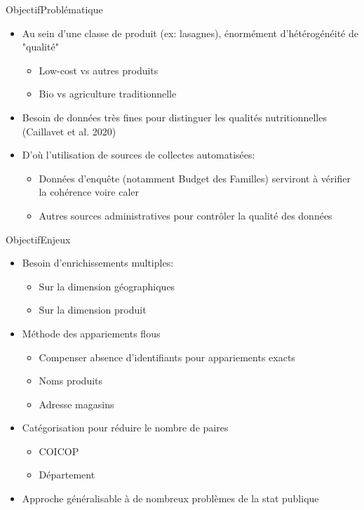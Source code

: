 \documentclass[ignorenonframetext,]{beamer}
\begin{document}
\begin{frame}{Objectif}{Problématique}

\begin{itemize}
    \item Au sein d'une classe de produit (ex: lasagnes), énormément d'hétérogénéité de "qualité"
\begin{itemize}
    \item Low-cost vs autres produits
    \item Bio vs agriculture traditionnelle
\end{itemize}
    \item Besoin de données très fines pour distinguer les qualités nutritionnelles (Caillavet et al. 2020)
    \item D'où l'utilisation de sources de collectes automatisées:
\begin{itemize}
    \item Données d'enquête (notamment Budget des Familles) serviront à vérifier la cohérence voire caler
    \item Autres sources administratives pour contrôler la qualité des données
\end{itemize}
\end{itemize}
\end{frame}

\begin{frame}{Objectif}{Enjeux}

\begin{itemize}
    \item Besoin d'enrichissements multiples:
\begin{itemize}
    \item Sur la dimension géographiques
    \item Sur la dimension produit
\end{itemize}
    \item Méthode des appariements flous 
\begin{itemize}
    \item Compenser absence d'identifiants pour appariements exacts
    \item Noms produits
    \item Adresse magasins
\end{itemize}
    \item Catégorisation pour réduire le nombre de paires
\begin{itemize}
    \item COICOP
    \item Département
\end{itemize}
\item Approche généralisable à de nombreux problèmes de la stat publique
\end{itemize}
\end{frame}
\end{document}
